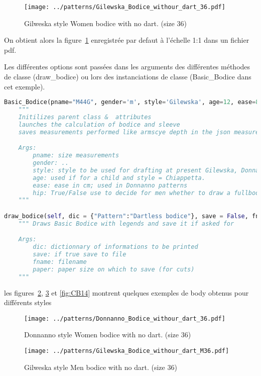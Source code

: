 \documentclass[11pt,a4paper]{report}
\begin{document}
\begin{figure}[hbtp]
\centering
\texttt{[image: ../patterns/Gilewska\_Bodice\_withour\_dart\_36.pdf]}
\caption{Gilweska style Women bodice with no dart. (size 36)}
\label{fig:bodice_WG36}
\end{figure}

On obtient alors la figure~\ref{fig:bodice_WG36} enregistrée par defaut à l'échelle 1:1 dans un fichier pdf.

Les différentes options sont passées dans les arguments des différentes méthodes de classe (draw\_bodice) ou lors des instanciations de classe (Basic\_Bodice dans cet exemple).

\begin{lstlisting}[language=python]
Basic_Bodice(pname="M44G", gender='m', style='Gilewska', age=12, ease=8, hip=True):
	"""
	Initilizes parent class &  attributes
	launches the calculation of bodice and sleeve
	saves measurements performed like armscye depth in the json measurements file for further processing in other classes

	Args:
		pname: size measurements
		gender: ..
		style: style to be used for drafting at present Gilewska, Donnanno and Chiapetta (for kids)
		age: used if for a child and style = Chiappetta.
		ease: ease in cm; used in Donnanno patterns
		hip: True/False use to decide for men whether to draw a fullbodice
	"""

draw_bodice(self, dic = {"Pattern":"Dartless bodice"}, save = False, fname = None, paper='FullSize'):
	""" Draws Basic Bodice with legends and save it if asked for

	Args:
		dic: dictionnary of informations to be printed
		save: if true save to file
		fname: filename
		paper: paper size on which to save (for cuts)
	"""
\end{lstlisting}

les figures~\ref{fig:bodice_DW36}, \ref{fig:bodice_MG36} et \ref{fig:CB14} montrent quelques exemples de body obtenus pour différents styles


\begin{figure}[hbtp]
\centering
\texttt{[image: ../patterns/Donnanno\_Bodice\_withour\_dart\_36.pdf]}
\caption{Donnanno style Women bodice with no dart. (size 36)}
\label{fig:bodice_DW36}
\end{figure}

\begin{figure}[hbtp]
\centering
\texttt{[image: ../patterns/Gilewska\_Bodice\_withour\_dart\_M36.pdf]}
\caption{Gilweska style Men bodice with no dart. (size 36)}
\label{fig:bodice_MG36}
\end{figure}
\end{document}
